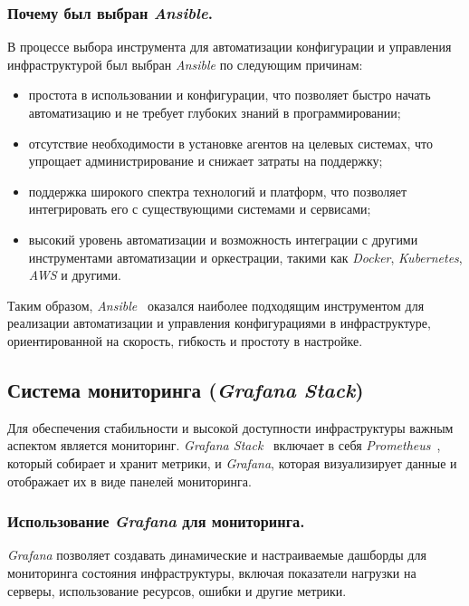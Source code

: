 \subsubsection{Почему был выбран \textit{Ansible}.}
В процессе выбора инструмента для автоматизации конфигурации и управления инфраструктурой был выбран \textit{Ansible} по следующим причинам:
\begin{itemize}
    \item простота в использовании и конфигурации, что позволяет быстро начать автоматизацию и не требует глубоких знаний в программировании;
    \item отсутствие необходимости в установке агентов на целевых системах, что упрощает администрирование и снижает затраты на поддержку;
    \item поддержка широкого спектра технологий и платформ, что позволяет интегрировать его с существующими системами и сервисами;
    \item высокий уровень автоматизации и возможность интеграции с другими инструментами автоматизации и оркестрации, такими как \textit{Docker}, \textit{Kubernetes}, \textit{AWS} и другими.
\end{itemize}

Таким образом, \textit{Ansible}~\cite{ansible} оказался наиболее подходящим инструментом для реализации автоматизации и управления конфигурациями в инфраструктуре, ориентированной на скорость, гибкость и простоту в настройке.

\subsection{Система мониторинга (\textit{Grafana Stack})}
\label{sec:monitoring}
Для обеспечения стабильности и высокой доступности инфраструктуры важным аспектом является мониторинг. \textit{Grafana Stack}~\cite{grafana} включает в себя \textit{Prometheus}~\cite{prometheus}, который собирает и хранит метрики, и \textit{Grafana}, которая визуализирует данные и отображает их в виде панелей мониторинга.

\subsubsection{Использование \textit{Grafana} для мониторинга.}
\textit{Grafana} позволяет создавать динамические и настраиваемые дашборды для мониторинга состояния инфраструктуры, включая показатели нагрузки на серверы, использование ресурсов, ошибки и другие метрики. 


